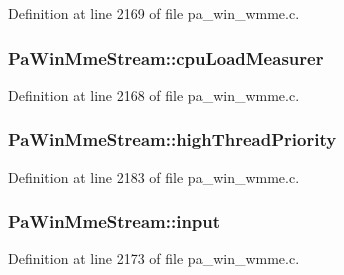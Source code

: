 Definition at line 2169 of file pa\+\_\+win\+\_\+wmme.\+c.

\subsubsection[{\texorpdfstring{cpu\+Load\+Measurer}{cpuLoadMeasurer}}]{ Pa\+Win\+Mme\+Stream\+::cpu\+Load\+Measurer}\hypertarget{struct_pa_win_mme_stream_aded3e078636a595d9da3494779adc0cc}{}\label{struct_pa_win_mme_stream_aded3e078636a595d9da3494779adc0cc}


Definition at line 2168 of file pa\+\_\+win\+\_\+wmme.\+c.

\subsubsection[{\texorpdfstring{high\+Thread\+Priority}{highThreadPriority}}]{ Pa\+Win\+Mme\+Stream\+::high\+Thread\+Priority}\hypertarget{struct_pa_win_mme_stream_a1aa8a6665f6bddaa562bc80c40239659}{}\label{struct_pa_win_mme_stream_a1aa8a6665f6bddaa562bc80c40239659}


Definition at line 2183 of file pa\+\_\+win\+\_\+wmme.\+c.

\subsubsection[{\texorpdfstring{input}{input}}]{ Pa\+Win\+Mme\+Stream\+::input}\hypertarget{struct_pa_win_mme_stream_adc282809ee20cc9326da74032e2cc175}{}\label{struct_pa_win_mme_stream_adc282809ee20cc9326da74032e2cc175}


Definition at line 2173 of file pa\+\_\+win\+\_\+wmme.\+c.

